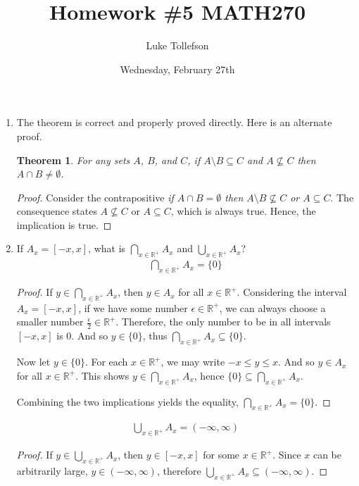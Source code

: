 \documentclass[12pt]{article}
\newtheorem{theorem}{Theorem}
\begin{document}
	
	\title{\Large Homework \#5 MATH270}
	\author{Luke Tollefson}
	\date{Wednesday, February 27th}
	
	\maketitle
	\begin{enumerate}
		\item The theorem is correct and properly proved directly. Here is an alternate proof.
		
		\begin{theorem}
			For any sets $A$, $B$, and $C$, if $A\setminus B\subseteq C$ and $A\not\subseteq C$ then $A\cap B\not=\emptyset$.
		\end{theorem}
		\begin{proof}
			Consider the contrapositive \textit{if $A\cap B=\emptyset$ then $A\setminus B\not\subseteq C$ or $A\subseteq C$}. The consequence states $A\not\subseteq C$ or $A\subseteq C$, which is always true. Hence, the implication is true.
		\end{proof}
		
		\item If $A_x=[-x,x]$, what is $\bigcap_{x\in \mathbb{R^+}}A_x$ and $\bigcup_{x\in \mathbb{R^+}}A_x$?
		\begin{align*}
			\bigcap_{x\in \mathbb{R^+}}A_x=\{0\}
		\end{align*}
		\begin{proof}
			If $y\in \bigcap_{x\in \mathbb{R^+}}A_x$, then $y\in A_x$ for all $x\in \mathbb{R^+}$. Considering the interval $A_x=[-x,x]$, if we have some number $\epsilon\in \mathbb{R^+}$, we can always choose a smaller number $\frac{\epsilon}{2}\in \mathbb{R^+}$. Therefore, the only number to be in all intervals $[-x,x]$ is 0. And so $y\in \{0\}$, thus $\bigcap_{x\in \mathbb{R^+}}A_x\subseteq\{0\}$.
			
			
			
			Now let $y\in \{0\}$. For each $x\in\mathbb{R^+}$, we may write $-x\leq y\leq x$. And so $y\in A_x$ for all $x\in\mathbb{R^+}$. This shows $y\in \bigcap_{x\in \mathbb{R^+}}A_x$, hence $\{0\}\subseteq \bigcap_{x\in \mathbb{R^+}}A_x$.
			
			Combining the two implications yields the equality, $\bigcap_{x\in \mathbb{R^+}}A_x=\{0\}$.
		\end{proof}
		\begin{align*}
			\bigcup_{x\in \mathbb{R^+}}A_x=(-\infty,\infty)
		\end{align*}
		\begin{proof}
			If $y\in \bigcup_{x\in \mathbb{R^+}}A_x$, then $y\in [-x,x]$ for some $x\in \mathbb{R^+}$. Since $x$ can be arbitrarily large, $y\in (-\infty,\infty)$, therefore $\bigcup_{x\in \mathbb{R^+}}A_x\subseteq(-\infty,\infty)$.
			

\end{proof}
\end{enumerate}
\end{document}
